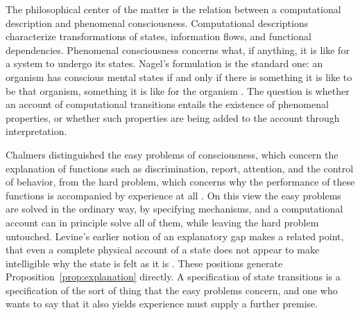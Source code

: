 \documentclass[12pt]{article}
\theoremstyle{definition}
\begin{document}
The philosophical center of the matter is the relation between a computational description and phenomenal consciousness. Computational descriptions characterize transformations of states, information flows, and functional dependencies. Phenomenal consciousness concerns what, if anything, it is like for a system to undergo its states. Nagel's formulation is the standard one: an organism has conscious mental states if and only if there is something it is like to be that organism, something it is like for the organism \cite{nagel1974}. The question is whether an account of computational transitions entails the existence of phenomenal properties, or whether such properties are being added to the account through interpretation.

Chalmers distinguished the easy problems of consciousness, which concern the explanation of functions such as discrimination, report, attention, and the control of behavior, from the hard problem, which concerns why the performance of these functions is accompanied by experience at all \cite{chalmers1995}. On this view the easy problems are solved in the ordinary way, by specifying mechanisms, and a computational account can in principle solve all of them, while leaving the hard problem untouched. Levine's earlier notion of an explanatory gap makes a related point, that even a complete physical account of a state does not appear to make intelligible why the state is felt as it is \cite{levine1983}. These positions generate Proposition~\ref{prop:explanation} directly. A specification of state transitions is a specification of the sort of thing that the easy problems concern, and one who wants to say that it also yields experience must supply a further premise.
\end{document}
